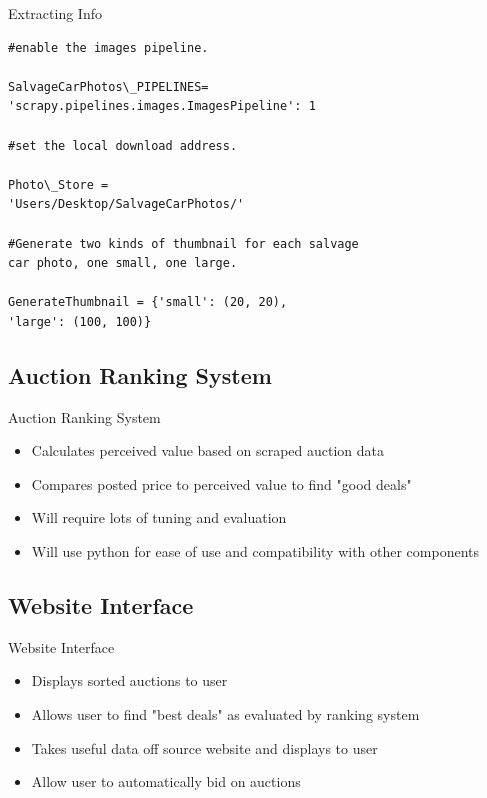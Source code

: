 \documentclass{beamer}
\begin{document}
\begin{frame}[fragile=singleslide]{Extracting Info}
\begin{verbatim}
#enable the images pipeline.

SalvageCarPhotos\_PIPELINES=
'scrapy.pipelines.images.ImagesPipeline': 1

#set the local download address.

Photo\_Store =
'Users/Desktop/SalvageCarPhotos/'

#Generate two kinds of thumbnail for each salvage
car photo, one small, one large.

GenerateThumbnail = {'small': (20, 20),
'large': (100, 100)}

\end{verbatim}
\end{frame}

\subsection{Auction Ranking System}

\begin{frame}{Auction Ranking System}

\begin{itemize}
    \setlength\itemsep{2em}
    \item Calculates perceived value based on scraped auction data
    \item Compares posted price to perceived value to find "good deals"
    \item Will require lots of tuning and evaluation 
    \item Will use python for ease of use and compatibility with other components

\end{itemize}

\end{frame}

\subsection{Website Interface}

\begin{frame}{Website Interface}

\begin{itemize}
    \setlength\itemsep{2em}
    \item Displays sorted auctions to user
    \item Allows user to find "best deals" as evaluated by ranking system
    \item Takes useful data off source website and displays to user
    \item Allow user to automatically bid on auctions

\end{itemize}

\end{frame}
\end{document}
